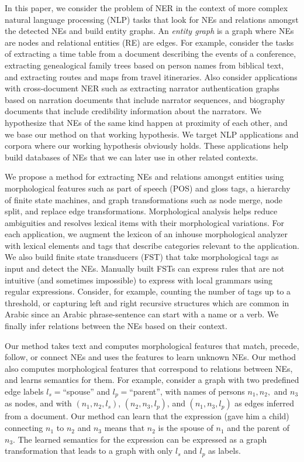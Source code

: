 \documentclass{llncs}
\newcommand{\utfRL}[1]{\setcode{utf8} \RL{#1} \setcode{standard}}
\begin{document}
In this paper, we consider the problem of NER
in the context of more complex natural language
processing (NLP) tasks that look for NEs and 
relations amongst the detected NEs and build entity graphs.
An {\em entity graph} is a graph where NEs are nodes and relational entities (RE) are edges.
For example, consider the tasks of extracting a time table
from a document describing the events of a conference, 
extracting genealogical family trees based on person names 
from biblical text,  and
extracting routes and maps from travel itineraries.
Also consider applications with cross-document NER
such as extracting narrator authentication graphs based on narration 
documents that include narrator sequences, and biography documents 
that include credibility information about the narrators. 
We hypothesize that NEs of the same kind happen 
at proximity of each other, and we base our method on that 
working hypothesis.
We target NLP applications and corpora where our working hypothesis
obviously holds.
These applications help build databases of NEs
that we can later use in other related contexts.

We propose a method for extracting NEs and 
relations amongst entities using 
morphological features such as part of speech (POS) and gloss tags, 
a hierarchy of finite state machines, 
and graph transformations such as node merge, node split, and replace edge transformations. 
Morphological analysis helps reduce ambiguities and resolves lexical items with their morphological variations.
For each application, we augment the lexicon of an inhouse morphological 
analyzer with lexical elements and tags that describe categories relevant to the application. 
We also build finite state transducers (FST) that take 
morphological tags as input and detect the NEs.
Manually built FSTs can express rules that are not intuitive (and sometimes impossible) 
to express with local grammars using regular expressions.
Consider, for example, counting the number of tags up to a threshold, or capturing left and right recursive structures 
which are common in Arabic since an Arabic phrase-sentence can start with a name or a verb.
We finally infer relations between the NEs based on their context.

Our method takes text and computes morphological features that match, precede, follow, or connect NEs
and uses the features to learn unknown NEs.
Our method also computes morphological features that correspond to relations between NEs, and learns semantics
for them. 
For example, consider a graph with two predefined edge labels $l_s=$``spouse'' and $l_p=$``parent'', 
with names of persons $n_1, n_2,$ and $n_3$ as nodes,
and with $(n_1,n_2,l_s)$, $(n_2,n_3,l_p)$, and $(n_1,n_3,l_p)$ as edges inferred from a document.
Our method can learn that the expression \utfRL{ولدت له} (gave him a child) connecting 
$n_1$ to $n_2$ and $n_3$ means that $n_2$ is the spouse of $n_1$
and the parent of $n_3$.
The learned semantics for the expression can be expressed as a graph transformation that leads to a graph with only 
$l_s$ and $l_p$ as labels. 
\end{document}
